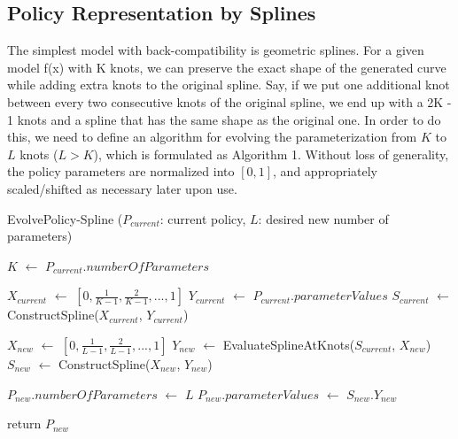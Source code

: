 \subsection{Policy Representation by Splines}
The simplest model with back-compatibility is geometric
splines. For a given model f(x) with K knots, we can preserve the
exact shape of the generated curve while adding extra knots to the
original spline. Say, if we put one additional knot between every two
consecutive knots of the original spline, we end up with a 2K - 1
knots and a spline that has the same shape as the original one. In
order to do this, we need to define an algorithm for evolving the
parameterization from $K$ to $L$ knots ($L > K$), which is formulated as 
Algorithm 1. Without loss of generality, the policy parameters are
normalized into $[0, 1]$, and appropriately scaled/shifted as necessary
later upon use.

\begin{algorithm}
\caption{EvolvePolicy-Spline ($P_{current}$: current policy, $L$: desired new number of parameters)}
\label{alg_Evolve_Spline}
\begin{algorithmic}[1]

\STATE $K$ $\leftarrow$ $P_{current}.numberOfParameters$

\STATE $X_{current}$ $\leftarrow$ $[0, \frac{1}{K-1}, \frac{2}{K-1}, ... , 1]$ %
\STATE $Y_{current}$ $\leftarrow$ $P_{current}.parameterValues$ %
\STATE $S_{current}$ $\leftarrow$ ConstructSpline($X_{current}$, $Y_{current}$) %

\STATE $X_{new}$ $\leftarrow$ $[0, \frac{1}{L-1}, \frac{2}{L-1}, ... , 1]$
\STATE $Y_{new}$ $\leftarrow$ EvaluateSplineAtKnots($S_{current}$, $X_{new}$)
\STATE $S_{new}$ $\leftarrow$ ConstructSpline($X_{new}$, $Y_{new}$)

\STATE $P_{new}.numberOfParameters$ $\leftarrow$ $L$
\STATE $P_{new}.parameterValues$ $\leftarrow$ $S_{new}$.$Y_{new}$

\STATE return $P_{new}$

\end{algorithmic}
\end{algorithm}


